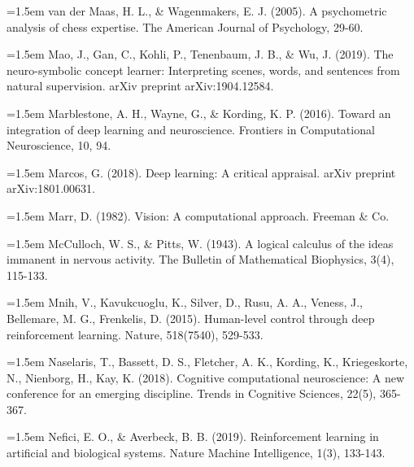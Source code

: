 \hangindent=1.5em
van der Maas, H. L., \& Wagenmakers, E. J. (2005).
A psychometric analysis of chess expertise.
The American Journal of Psychology, 29-60.
\par

\hangindent=1.5em
Mao, J., Gan, C., Kohli, P., Tenenbaum, J. B., \& Wu, J. (2019).
The neuro-symbolic concept learner:
Interpreting scenes, words, and sentences from natural supervision.
arXiv preprint arXiv:1904.12584.
\par

\hangindent=1.5em
Marblestone, A. H., Wayne, G., \& Kording, K. P. (2016).
Toward an integration of deep learning and neuroscience.
Frontiers in Computational Neuroscience, 10, 94.
\par

\hangindent=1.5em
Marcos, G. (2018).
Deep learning: A critical appraisal.
arXiv preprint arXiv:1801.00631.
\par

\hangindent=1.5em
Marr, D. (1982).
Vision: A computational approach.
Freeman \& Co.
\par

\hangindent=1.5em
McCulloch, W. S., \& Pitts, W. (1943).
A logical calculus of the ideas immanent in nervous activity.
The Bulletin of Mathematical Biophysics, 3(4), 115-133.
\par

\hangindent=1.5em
Mnih, V., Kavukcuoglu, K., Silver, D., Rusu, A. A.,
Veness, J., Bellemare, M. G., Frenkelis, D. (2015).
Human-level control through deep reinforcement learning.
Nature, 518(7540), 529-533.
\par

\hangindent=1.5em
Naselaris, T., Bassett, D. S., Fletcher, A. K., Kording, K.,
Kriegeskorte, N., Nienborg, H., Kay, K. (2018).
Cognitive computational neuroscience:
A new conference for an emerging discipline.
Trends in Cognitive Sciences, 22(5), 365-367.
\par

\hangindent=1.5em
Nefici, E. O., \& Averbeck, B. B. (2019).
Reinforcement learning in artificial and biological systems.
Nature Machine Intelligence, 1(3), 133-143.
\par

